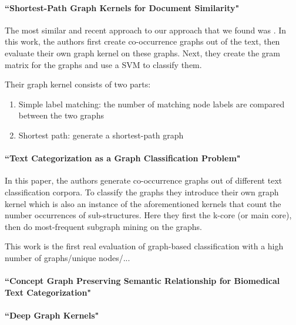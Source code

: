 \paragraph{``Shortest-Path Graph Kernels for Document Similarity" \cite{Nikolentzos2017a}}
The most similar and recent approach to our approach that we found was \cite{Nikolentzos2017a}. In this work, the authors first create co-occurrence graphs out of the text, then evaluate their own graph kernel on these graphs. Next, they create the gram matrix for the graphs and use a SVM to classify them. 

Their graph kernel consists of two parts:
\begin{enumerate}
\item{Simple label matching: the number of matching node labels are compared between the two graphs}
\item{Shortest path: generate a shortest-path graph}
\end{enumerate}

\paragraph{``Text Categorization as a Graph Classification Problem" \cite{Rousseau2015a}}
In this paper, the authors generate co-occurrence graphs out of different text classification corpora.
To classify the graphs they introduce their own graph kernel which is also an instance of the aforementioned kernels that count the number occurrences of sub-structures.
Here they first the k-core (or main core), then do most-frequent subgraph mining on the graphs.

This work is the first real evaluation of graph-based classification with a high number of graphs/unique nodes/...


\paragraph{``Concept Graph Preserving Semantic Relationship for Biomedical Text Categorization" \cite{Gulrandhe2015}}

\paragraph{``Deep Graph Kernels" \cite{Yanardag2015}}
